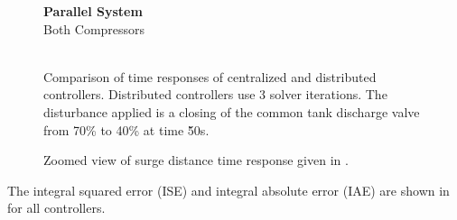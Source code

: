 \begin{figure}
  {\centering\small\textbf{Parallel System}\\Both Compressors\\[0.5em]}
    \resizebox{0.48\linewidth}{!}{%
      
    }
  \hfill
    \resizebox{0.48\linewidth}{!}{%
      
    }
  \\
    \resizebox{0.48\linewidth}{!}{%
      
    }
  \hfill
    \resizebox{0.48\linewidth}{!}{%
      
    }
  \caption[Time response of parallel system.]{Comparison of time responses of centralized and distributed controllers. Distributed controllers use 3 solver iterations. The disturbance applied is a closing of the common tank discharge valve from 70\% to 40\% at time \u{50}{s}.}
  \label{fig:res:parallel-timeresp}
\end{figure}

\begin{figure}
  \centering
  \resizebox{0.5\linewidth}{!}{%
    
  }
  \caption[Zoomed view of surge distance time response of parallel system.]{Zoomed view of surge distance time response given in .}
  \label{fig:res:parallel-sd-zoom}
\end{figure}

The integral squared error (ISE) and integral absolute error (IAE) are shown in  for all controllers.

